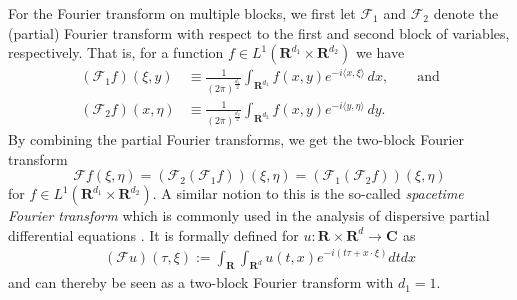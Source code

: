 \documentclass[a4paper]{article}
\newcommand{\rr}[1]{\mathbf{R}^{#1}}
\newcommand{\cc}[1]{\mathbf{C}^{#1}}
\newcommand{\scal}[2]{\langle #1,#2\rangle}
\numberwithin{equation}{section}
\theoremstyle{remark}
\begin{document}
For the Fourier transform on multiple blocks,
we first let $\mathscr {F}_1$ and $ \mathscr {F}_2$
denote the (partial) Fourier transform
with respect to the first and second block of variables, respectively.
That is,
for a function $f\in L^{1}(\rr{d_1}\times\rr{d_2})$
we have
\begin{align*}
(\mathscr {F}_1f)(\xi,y)&
\equiv \frac{1}{(2\pi)^{\frac{d_1}{2}}}
    \int _{\rr{d_1}} f(x, y)e^{-i\scal  x\xi }\, dx,
\qquad\text{and}\\
(\mathscr {F}_2f)(x,\eta)
&\equiv \frac{1}{(2\pi)^{\frac{d_2}{2}}}
    \int _{\rr{d_2}} f(x, y)e^{-i\scal  y\eta }\, dy.
\end{align*}
By combining the partial Fourier transforms,
we get the two-block Fourier transform
\begin{equation}\label{eq:spacetimeFourierTransfrom}
\mathscr{F}f(\xi,\eta)
= (\mathscr {F}_2(\mathscr {F}_1f))(\xi,\eta)
= (\mathscr {F}_1(\mathscr {F}_2f))(\xi,\eta)
\end{equation}
for $f\in L^{1}(\rr{d_1}\times\rr{d_2})$.
A similar notion to this is the
so-called \emph{spacetime Fourier transform}
which is commonly used in the analysis of dispersive partial differential equations
\cite{Tao06NonlinearDispersiveEquations}.
It is formally defined for $u: \rr{}\times\rr{d}\rightarrow \cc{}$ as
\begin{align*}
(\mathscr{F}{u})(\tau, \xi):=\int_{\mathbf{R}} \int_{\mathbf{R}^d} u(t, x) e^{-i(t \tau+x \cdot \xi)} d t d x
\end{align*}
and can thereby be seen as a two-block Fourier transform with $d_1=1$.
\end{document}
